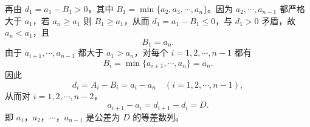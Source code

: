 \begin{answer}
再由 $d_1=a_1-B_1>0$，其中 $B_1=\min\{a_2,a_3,\cdots,a_n\}$。因为 $a_2,\cdots,a_{n-1}$ 都严格大于 $a_1$，若 $a_n\geqslant a_1$ 则 $B_1\geqslant a_1$，从而 $d_1=a_1-B_1\leqslant0$，与 $d_1>0$ 矛盾，故 $a_n<a_1$，且
\nopagebreak[4]
\[B_1=a_n.\]
由于 $a_{i+1},\cdots,a_{n-1}$ 都大于 $a_1>a_n$，对每个 $i=1,2,\cdots,n-1$ 都有
\nopagebreak[4]
\[B_i=\min\{a_{i+1},\cdots,a_n\}=a_n.\]
因此
\nopagebreak[4]
\[d_i=A_i-B_i=a_i-a_n\quad(i=1,2,\cdots,n-1),\]
从而对 $i=1,2,\cdots,n-2$，
\nopagebreak[4]
\[a_{i+1}-a_i=d_{i+1}-d_i=D.\]
即 $a_1$，$a_2$，$\cdots$，$a_{n-1}$ 是公差为 $D$ 的等差数列。




\end{answer}